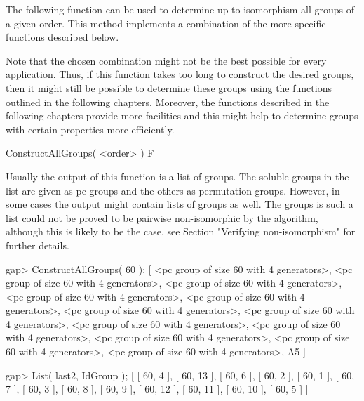 


The following function can be used to determine up to isomorphism
all groups of a given order. This method implements a combination 
of the more specific functions described below. 

Note that the chosen combination might not be the best possible for 
every application. Thus, if this function takes too long to construct 
the desired groups, then it might still be possible to determine these 
groups using the functions outlined in the following chapters. Moreover, 
the functions described in the following chapters provide more facilities
and this might help to determine groups with certain properties more 
efficiently.

\> ConstructAllGroups( <order> ) F

Usually the output of this function is a list of groups. The soluble
groups in the list are given as pc groups and the others as permutation 
groups. However, in some cases the output might contain lists of groups
as well. The groups is such a list could not be proved to be pairwise
non-isomorphic by the algorithm, although this is likely to be the case,
see Section "Verifying non-isomorphism" for further details. 

\beginexample
gap> ConstructAllGroups( 60 );
[ <pc group of size 60 with 4 generators>, 
  <pc group of size 60 with 4 generators>, 
  <pc group of size 60 with 4 generators>, 
  <pc group of size 60 with 4 generators>, 
  <pc group of size 60 with 4 generators>, 
  <pc group of size 60 with 4 generators>, 
  <pc group of size 60 with 4 generators>, 
  <pc group of size 60 with 4 generators>, 
  <pc group of size 60 with 4 generators>, 
  <pc group of size 60 with 4 generators>, 
  <pc group of size 60 with 4 generators>, 
  <pc group of size 60 with 4 generators>, 
  A5 ]

gap> List( last2, IdGroup );
[ [ 60, 4 ], [ 60, 13 ], [ 60, 6 ], [ 60, 2 ], [ 60, 1 ], [ 60, 7 ], 
  [ 60, 3 ], [ 60, 8 ], [ 60, 9 ], [ 60, 12 ], [ 60, 11 ], [ 60, 10 ], 
  [ 60, 5 ] ]
\endexample

